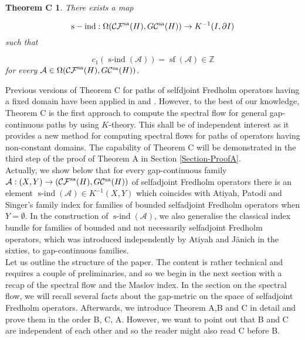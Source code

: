 \documentclass[a4paper,10pt]{article}
\newtheorem*{theoremC}{Theorem C}
\DeclareMathOperator{\sind}{s-ind}
\DeclareMathOperator{\sfl}{sf}
\begin{document}
\begin{theoremC}
There exists a map

\[\sind:\Omega(\mathcal{CF}^\textup{sa}(H),G\mathcal{C}^\textup{sa}(H))\rightarrow K^{-1}(I,\partial I)\]
such that 

\[c_1(\sind(\mathcal{A}))=\sfl(\mathcal{A})\in\mathbb{Z}\]
for every $\mathcal{A}\in\Omega(\mathcal{CF}^\textup{sa}(H),G\mathcal{C}^\textup{sa}(H))$. 
\end{theoremC}
\noindent  
Previous versions of Theorem C for paths of selfdjoint Fredholm operators having a fixed domain have been applied in \cite{IchK} and \cite{CalcVar}. However, to the best of our knowledge, Theorem C is the first approach to compute the spectral flow for general gap-continuous paths by using $K$-theory. This shall be of independent interest as it provides a new method for computing spectral flows for paths of operators having non-constant domains. The capability of Theorem C will be demonstrated in the third step of the proof of Theorem A in Section \ref{Section-ProofA}.\\
Actually, we show below that for every gap-continuous family $\mathcal{A}:(X,Y)\rightarrow(\mathcal{CF}^\textup{sa}(H),G\mathcal{C}^\textup{sa}(H))$ of selfadjoint Fredholm operators there is an element $\sind(\mathcal{A})\in K^{-1}(X,Y)$ which coincides with Atiyah, Patodi and Singer's family index for families of bounded selfadjoint Fredholm operators when $Y=\emptyset$. In the construction of $\sind(\mathcal{A})$, we also generalise the classical index bundle for families of bounded and not necessarily selfadjoint Fredholm operators, which was introduced independently by Atiyah and J\"anich in the sixties, to gap-continuous families.\\     
Let us outline the structure of the paper. The content is rather technical and requires a couple of preliminaries, and so we begin in the next section with a recap of the spectral flow and the Maslov index. In the section on the spectral flow, we will recall several facts about the gap-metric on the space of selfadjoint Fredholm operators. Afterwards, we introduce Theorem A,B and C in detail and prove them in the order B, C, A. However, we want to point out that B and C are independent of each other and so the reader might also read C before B.\\
\end{document}

